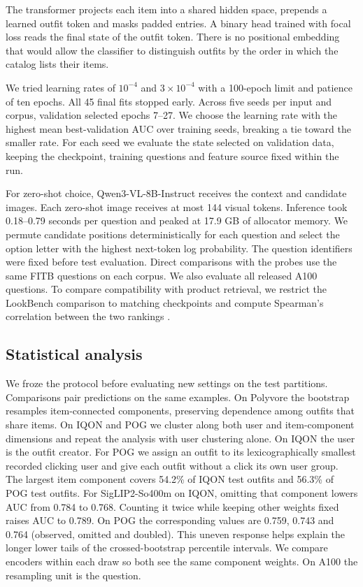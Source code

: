 \documentclass[preprint,12pt]{elsarticle}
\begin{document}
The transformer projects each item into a shared hidden space, prepends a learned outfit token and masks padded entries. A binary head trained with focal loss \cite{focal} reads the final state of the outfit token. There is no positional embedding that would allow the classifier to distinguish outfits by the order in which the catalog lists their items.

We tried learning rates of $10^{-4}$ and $3\times10^{-4}$ with a 100-epoch limit and patience of ten epochs. All 45 final fits stopped early. Across five seeds per input and corpus, validation selected epochs 7--27. We choose the learning rate with the highest mean best-validation AUC over training seeds, breaking a tie toward the smaller rate. For each seed we evaluate the state selected on validation data, keeping the checkpoint, training questions and feature source fixed within the run.

For zero-shot choice, Qwen3-VL-8B-Instruct \cite{qwenvl} receives the context and candidate
images. Each zero-shot image receives at most 144 visual tokens. Inference took 0.18--0.79 seconds per question and peaked at 17.9 GB of allocator memory. We permute candidate positions deterministically for each question and
select the option letter with the highest next-token log probability. The question
identifiers were fixed before test evaluation. Direct comparisons with the probes
use the same FITB questions on each corpus. We also evaluate all released A100
questions. To compare compatibility with product retrieval, we restrict the
LookBench comparison to matching checkpoints and compute Spearman's correlation
between the two rankings \cite{gao2026lookbench}.

\subsection{Statistical analysis}
We froze the protocol before evaluating new settings on the test partitions.
Comparisons pair predictions on the same examples. On Polyvore the bootstrap
resamples item-connected components, preserving dependence among outfits that
share items. On IQON and POG we cluster along both user and item-component
dimensions \cite{cameron2011multiway} and repeat the analysis with user clustering alone. On IQON the user is the outfit creator. For POG we assign an outfit to its lexicographically smallest
recorded clicking user and give each outfit without a click its own user group.
The largest item component covers 54.2\% of IQON test outfits and 56.3\% of POG test outfits. For SigLIP2-So400m on IQON, omitting that component lowers AUC from 0.784 to 0.768. Counting it twice while keeping other weights fixed raises AUC to 0.789. On POG the corresponding values are 0.759, 0.743 and 0.764 (observed, omitted and doubled). This uneven response helps explain the longer lower tails of the crossed-bootstrap percentile intervals. We compare encoders within each draw so both see the same component weights. On A100 the resampling unit is the question.
\end{document}
